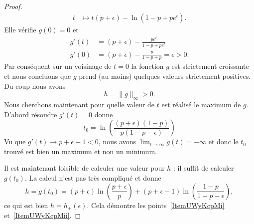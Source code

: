 \begin{proof}
\begin{equation}
\begin{aligned}
			t             & \mapsto t(p+\epsilon)-\ln(1-p+pe^t).
		\end{aligned}
	\end{equation}
	Elle vérifie \( g(0)=0\) et
	\begin{subequations}
		\begin{align}
			g'(t) & =(p+\epsilon)- \frac{ pe^t }{ 1-p+pe^t }       \\
			g'(0) & =(p+\epsilon)- \frac{ p }{ 1-p+p }=\epsilon>0.
		\end{align}
	\end{subequations}
	Par conséquent sur un voisinage de \( t=0\) la fonction \( g\) est strictement croissante et nous concluons que \( g\) prend (au moins) quelques valeurs strictement positives. Du coup nous avons
	\begin{equation}
		h=\| g \|_{\infty}>0.
	\end{equation}
	Nous cherchons maintenant pour quelle valeur de \( t\) est réalisé le maximum de \( g\). D'abord résoudre \( g'(t)=0\) donne
	\begin{equation}
		t_0=\ln\left( \frac{ (p+\epsilon)(1-p) }{ p(1-p-\epsilon) } \right)
	\end{equation}
	Vu que \( g'(t)\to p+\epsilon-1<0\), nous avons \( \lim_{t\to \infty} g(t)=-\infty\) et donc le \( t_0\) trouvé est bien un maximum et non un minimum.

	Il est maintenant loisible de calculer une valeur pour \( h\) : il suffit de calculer \( g(t_0)\). La calcul n'est pas très compliqué et donne
	\begin{equation}
		h=g(t_0)=(p+\epsilon)\ln\left( \frac{ p+\epsilon }{ p } \right)+(p+\epsilon-1)\ln\left( \frac{ 1-p }{ 1-p-\epsilon } \right),
	\end{equation}
	ce qui est bien \( h=h_+(\epsilon)\). Cela démontre les points~\ref{ItemUWyKcpMi} et~\ref{ItemUWyKcpMii}.


\end{proof}
